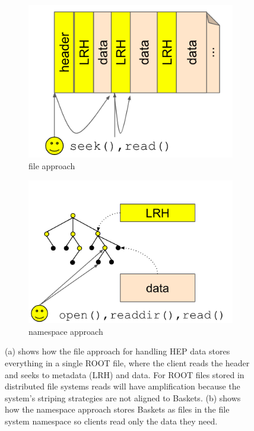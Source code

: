 \begin{figure}[t!]
    \centering
    \begin{subfigure}[b]{.45\linewidth}
      \centering
      \includegraphics[width=1.0\linewidth]{figures/tree_hep_a.png} 
      \caption{file approach}
      \label{fig:tree_hep_a}
    \end{subfigure}
    \begin{subfigure}[b]{.45\linewidth}
      \centering
      \includegraphics[width=1.0\linewidth]{figures/tree_hep_b.png} 
      \caption{namespace approach}
      \label{fig:tree_hep_b}
    \end{subfigure}
    \caption{(a) shows how the file approach for handling HEP data stores
everything in a single ROOT file, where the client reads the header and seeks
to metadata (LRH) and data. For ROOT files stored in distributed file systems reads will
have amplification because the system's striping strategies are not aligned to
Baskets. (b) shows how the namespace approach stores Baskets as files in the
file system namespace so clients read only the data they need.}
\end{figure}

